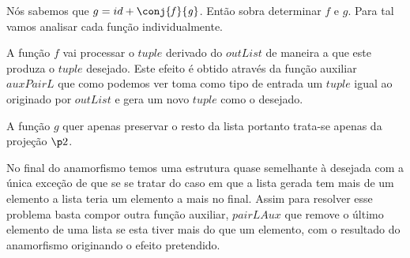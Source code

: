 \documentclass[a4paper]{article}
\newcommand{\Varid}[1]{\mathit{#1}}
\def\resethooks{%
  \global\let\SaveRestoreHook\empty
  \global\let\ColumnHook\empty}
\newlength{\blanklineskip}
\newcommand{\hsindent}[1]{\quad}%
\let\hspre\empty
\let\hspost\empty
\begin{document}
Nós sabemos que $g = id + \ensuremath{\conj{\Varid{f}}{\Varid{g}}}$. Então sobra determinar $f$ e $g$. Para tal vamos analisar
cada função individualmente.

A função $\ensuremath{\Varid{f}}$ vai processar o $tuple$ derivado do $\ensuremath{\Varid{outList}}$ de maneira a que este produza o $tuple$ desejado. Este
efeito é obtido através da função auxiliar $\ensuremath{\Varid{auxPairL}}$ que como podemos ver toma como tipo de entrada um $tuple$
igual ao originado por $\ensuremath{\Varid{outList}}$ e gera um novo $tuple$ como o desejado.

A função $\ensuremath{\Varid{g}}$ quer apenas preservar o resto da lista portanto trata-se apenas da projeção $\ensuremath{\p2}$.

No final do anamorfismo temos uma estrutura quase semelhante à desejada com a única exceção de que se se tratar
do caso em que a lista gerada tem mais de um elemento a lista teria um elemento a mais no final. Assim para resolver esse
problema basta compor outra função auxiliar, $\ensuremath{\Varid{pairLAux}}$ que remove o último elemento de uma lista se esta tiver mais
do que um elemento, com o resultado do anamorfismo originando o efeito pretendido.

\resethooks
\end{document}
